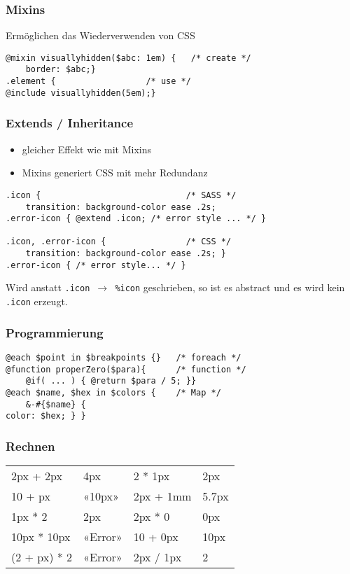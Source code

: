 \subsubsection{Mixins}
Ermöglichen das Wiederverwenden von CSS
\begin{lstlisting}
@mixin visuallyhidden($abc: 1em) {   /* create */
    border: $abc;}
.element {                  /* use */
@include visuallyhidden(5em);}
\end{lstlisting}

\subsubsection{Extends / Inheritance}
\begin{itemize}
    \item gleicher Effekt wie mit Mixins
    \item Mixins generiert CSS mit mehr Redundanz
\end{itemize}
\begin{lstlisting}
.icon {                             /* SASS */
    transition: background-color ease .2s;
.error-icon { @extend .icon; /* error style ... */ }

.icon, .error-icon {                /* CSS */
    transition: background-color ease .2s; }
.error-icon { /* error style... */ }
\end{lstlisting}
Wird anstatt \texttt{.icon $\rightarrow$ \%icon} geschrieben, so ist es abstract und es wird kein \texttt{.icon} erzeugt.

\subsubsection{Programmierung}
\begin{lstlisting}
@each $point in $breakpoints {}   /* foreach */
@function properZero($para){      /* function */
    @if( ... ) { @return $para / 5; }}
@each $name, $hex in $colors {    /* Map */
    &-#{$name} {
color: $hex; } }

\end{lstlisting}

\subsubsection{Rechnen}
\begin{tabular}{p{1.3cm} l | p{1.3cm} l}
    2px + 2px & 4px       &   2 * 1px & 2px\\
    10 + px & «10px»      &   2px + 1mm & 5.7px\\
    1px * 2 & 2px         &   2px * 0 & 0px\\
    10px * 10px & «Error» &   10 + 0px & 10px\\
    (2 + px) * 2 &  «Error»&   2px / 1px & 2\\
\end{tabular}

